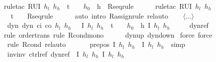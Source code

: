 \documentclass[envcountsame,envcountsect]{llncs}
\begin{document}
\begin{example}
\begin{isabellebody}
{\isacharparenleft}rule{\isacharunderscore}tac\ R{\isacharequal}{\isachardoublequoteopen}U{\isacharparenleft}I\ $h_l$\ $h_h$\ {\isasymand}\ t\ {\isacharequal}\ {}\ {\isasymand}\ $h_0$\ {\isacharequal}\ h{\isacharparenright}{\isachardoublequoteclose}\ \ R{\isacharunderscore}seq{\isacharunderscore}rule{\isacharparenright}\isanewline
\ \ \ \ \ \isamarkupfalse%
{\isacharparenleft}rule{\isacharunderscore}tac\ R{\isacharequal}{\isachardoublequoteopen}U{\isacharparenleft}I\ $h_l$\ $h_h$\ {\isasymand}\ t\ {\isacharequal}\ {}{\isacharparenright}{\isachardoublequoteclose}\ \ R{\isacharunderscore}seq{\isacharunderscore}rule{\isacharparenright}\isanewline
\ \ \ \ \isamarkupfalse%
\ {\isacharparenleft}auto\ intro{\isacharbang}{\isacharcolon}\ R{\isacharunderscore}assign{\isacharunderscore}rule{\isacharcomma}\ rel{\isacharunderscore}auto{\isacharprime}{\isacharparenright}\isanewline
\ \ %
\ $\langle\dots\rangle$\isanewline
\ \ \isamarkupfalse%
\ dyn{\isacharcolon}\ {\isachardoublequoteopen}dyn\ c\isactrlsub i\ c\isactrlsub o\ $h_l$\ $h_h$\ {\isasymtau}\ {\isasymle}\ \isactrlbold {\isacharbrackleft}I\ $h_l$\ $h_h$\ {\isasymand}\ t\ {\isacharequal}\ {}\ {\isasymand}\ $h_0$\ {\isacharequal}\ h{\isacharcomma}\ I\ $h_l$\ $h_h$\isactrlbold {\isacharbrackright}{\isachardoublequoteclose}\isanewline 
\ \ {\isacharparenleft}\ {\isachardoublequoteopen}{\isacharunderscore}\ {\isasymle}\ {\isacharquery}dyn{\isacharunderscore}ref{\isachardoublequoteclose}{\isacharparenright}\ \isamarkupfalse%
{\isacharparenleft}rule\ order{\isacharunderscore}trans{\isacharcomma}\ rule\ R{\isacharunderscore}cond{\isacharunderscore}mono{\isacharparenright}\isanewline
\ \ \ \ \isamarkupfalse%
\ dynup\ dyndown\ \isamarkupfalse%
{\isacharparenleft}force{\isacharcomma}\ force{\isacharparenright}\isanewline
\ \ \ \ \isamarkupfalse%
\ {\isacharparenleft}rule\ R{\isacharunderscore}cond{\isacharcomma}\ rel{\isacharunderscore}auto{\isacharprime}{\isacharparenright}\isanewline
\ \ %
\isanewline
\ \ \isamarkupfalse%
\ pre{\isacharunderscore}pos{\isacharcolon}\ {\isachardoublequoteopen}{\isasymlceil}I\ $h_l$\ $h_h${\isasymrceil}\ {\isasymle}\ {\isasymlceil}I\ $h_l$\ $h_h${\isasymrceil}{\isachardoublequoteclose}\ \isamarkupfalse\ simp\isanewline
\ \ \isamarkupfalse%
\ inv{\isacharunderscore}inv{\isacharcolon}\ {\isachardoublequoteopen}{\isacharquery}ctrl{\isacharunderscore}ref{\isacharsemicolon}\ {\isacharquery}dyn{\isacharunderscore}ref\ {\isasymle}\ \isactrlbold {\isacharbrackleft}I\ $h_l$\ $h_h${\isacharcomma}\ I\ $h_l$\ $h_h$\isactrlbold {\isacharbrackright}{\isachardoublequoteclose}\ \isamarkupfalse%

\end{isabellebody}
\end{example}
\end{document}
